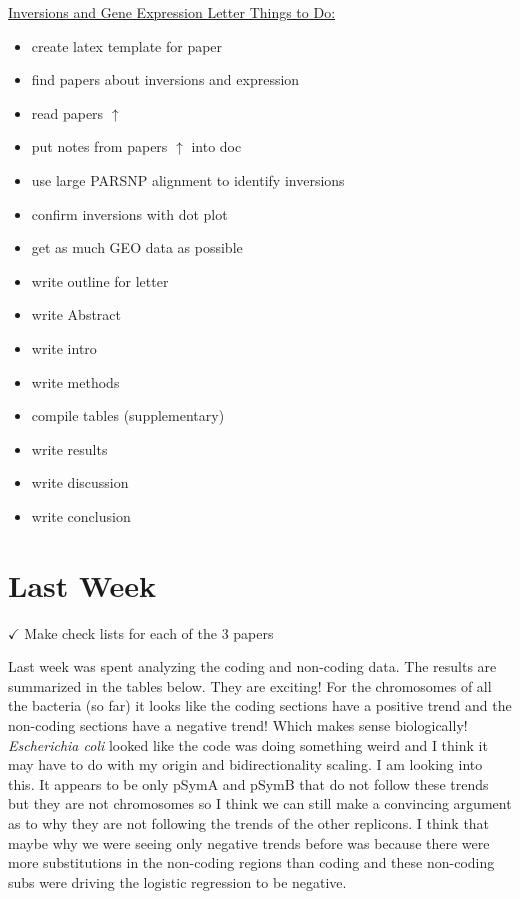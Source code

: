\documentclass[12pt]{article}
\newcommand{\ecoli}{\textit{Escherichia coli}\xspace}
\newcommand{\pa}{pSymA\xspace}
\newcommand{\pb}{pSymB\xspace}
\begin{document}
\underline{Inversions and Gene Expression Letter Things to Do:}
\begin{itemize}
	\item create latex template for paper
	
	\item find papers about inversions and expression
	
	\item read papers $\uparrow$
	
	\item put notes from papers $\uparrow$ into doc
	
	\item use large PARSNP alignment to identify inversions
	
	\item confirm inversions with dot plot
	
	\item get as much GEO data as possible
	
	\item write outline for letter
	
	\item write Abstract
	
	\item write intro
	
	\item write methods
	
	\item compile tables (supplementary)
	
	\item write results
	
	\item write discussion
	
	\item write conclusion 
\end{itemize}




	
\section*{Last Week}

$\checkmark$ Make check lists for each of the 3 papers



Last week was spent analyzing the coding and non-coding data. The results are summarized in the tables below.
They are exciting! 
For the chromosomes of all the bacteria (so far) it looks like the coding sections have a positive trend and the non-coding sections have a negative trend! Which makes sense biologically!
\ecoli looked like the code was doing something weird and I think it may have to do with my origin and bidirectionality scaling. I am looking into this.
It appears to be only \pa and \pb that do not follow these trends but they are not chromosomes so I think we can still make a convincing argument as to why they are not following the trends of the other replicons.
I think that maybe why we were seeing only negative trends before was because there were more substitutions in the non-coding regions than coding and these non-coding subs were driving the logistic regression to be negative.
\end{document}

